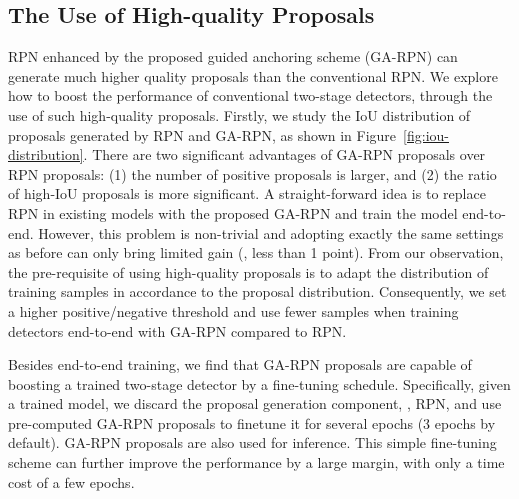 \documentclass[10pt,twocolumn,letterpaper]{article}
\begin{document}
\subsection{The Use of High-quality Proposals}
RPN enhanced by the proposed guided anchoring scheme (GA-RPN) can generate much higher quality proposals than the conventional RPN.
We explore how to boost the performance of conventional two-stage detectors, through the use of such high-quality proposals.
Firstly, we study the IoU distribution of proposals generated by RPN and GA-RPN, as shown in Figure~\ref{fig:iou-distribution}.
There are two significant advantages of GA-RPN proposals over RPN proposals:
(1) the number of positive proposals is larger, and (2) the ratio of high-IoU
proposals is more significant.
A straight-forward idea is to replace RPN in existing models with the proposed GA-RPN
and train the model end-to-end.
However, this problem is non-trivial and adopting exactly the same settings as before can only bring limited gain (\eg, less than 1 point).
From our observation, the pre-requisite of using high-quality proposals is to adapt the distribution of training
samples in accordance to the proposal distribution. Consequently, we set a higher positive/negative threshold and use fewer samples when training
detectors end-to-end with GA-RPN compared to RPN.

Besides end-to-end training, we find that GA-RPN proposals are capable of boosting a trained
two-stage detector by a fine-tuning schedule. Specifically, given a trained model, we discard the proposal generation component, \eg, RPN, and use pre-computed GA-RPN proposals to finetune it for several epochs (3 epochs by default).
GA-RPN proposals are also used for inference.
This simple fine-tuning scheme can further improve the performance by a large margin,
with only a time cost of a few epochs.
 
\end{document}
